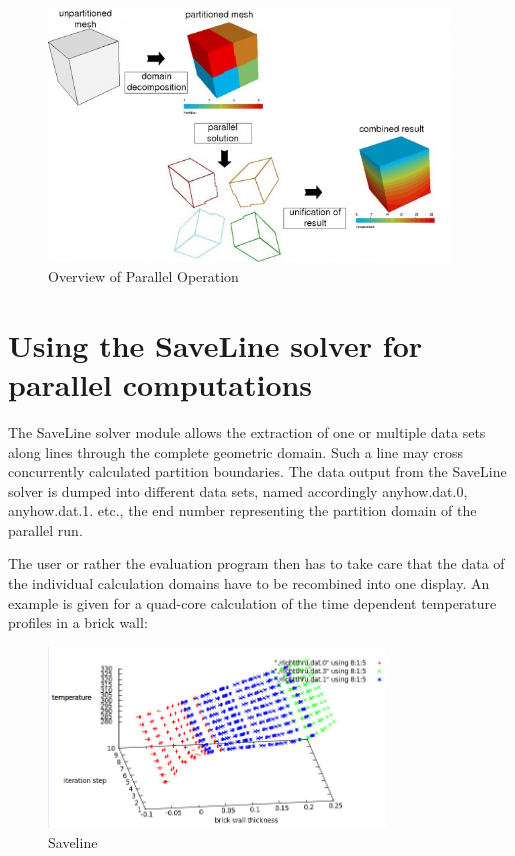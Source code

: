 \begin{figure}[H]
\centering
\includegraphics[width=0.95\textwidth]{Parallelconcept}
\caption{Overview of Parallel Operation}\label{fg:concept}
\end{figure}

\section{Using the SaveLine solver for parallel computations}

The SaveLine solver module allows the extraction of one or multiple data sets along lines through the complete geometric domain. Such a line may cross concurrently calculated partition boundaries. The data output from the SaveLine solver is dumped into different data sets, named accordingly anyhow.dat.0, anyhow.dat.1. etc., the end number representing the partition domain of the parallel run.

The user or rather the evaluation program then has to take care that the data of the individual calculation domains have to be recombined into one display. An example is given for a quad-core calculation of the time dependent temperature profiles in a brick wall: 

\begin{figure}[H]
\centering
\includegraphics[width=0.8\textwidth]{Temp-Profile}
\caption{Saveline}\label{fg:saveline}
\end{figure}

